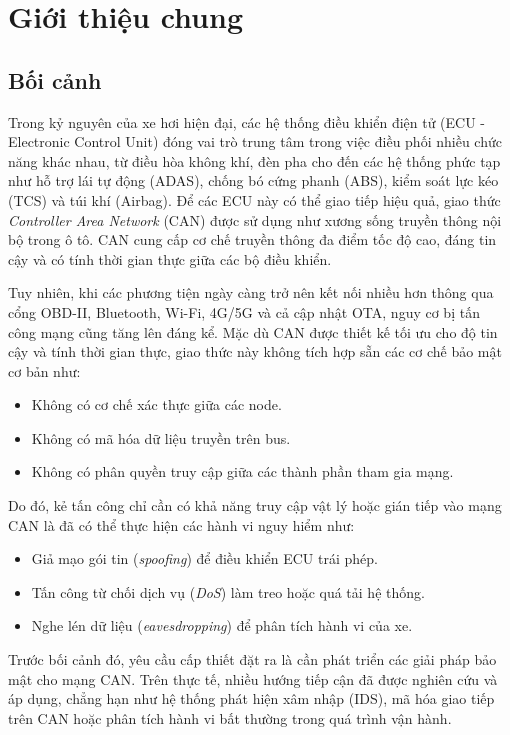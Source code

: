 \chapter{Giới thiệu chung}

\section{Bối cảnh}
Trong kỷ nguyên của xe hơi hiện đại, các hệ thống điều khiển điện tử (ECU - Electronic Control Unit) đóng vai trò trung tâm trong việc điều phối nhiều chức năng khác nhau, từ điều hòa không khí, đèn pha cho đến các hệ thống phức tạp như hỗ trợ lái tự động (ADAS), chống bó cứng phanh (ABS), kiểm soát lực kéo (TCS) và túi khí (Airbag). Để các ECU này có thể giao tiếp hiệu quả, giao thức \textit{Controller Area Network} (CAN) được sử dụng như xương sống truyền thông nội bộ trong ô tô. CAN cung cấp cơ chế truyền thông đa điểm tốc độ cao, đáng tin cậy và có tính thời gian thực giữa các bộ điều khiển.

Tuy nhiên, khi các phương tiện ngày càng trở nên kết nối nhiều hơn thông qua cổng OBD-II, Bluetooth, Wi-Fi, 4G/5G và cả cập nhật OTA, nguy cơ bị tấn công mạng cũng tăng lên đáng kể. Mặc dù CAN được thiết kế tối ưu cho độ tin cậy và tính thời gian thực, giao thức này không tích hợp sẵn các cơ chế bảo mật cơ bản như:

\begin{itemize}[leftmargin=*]
    \item Không có cơ chế xác thực giữa các node.
    \item Không có mã hóa dữ liệu truyền trên bus.
    \item Không có phân quyền truy cập giữa các thành phần tham gia mạng.
\end{itemize}

Do đó, kẻ tấn công chỉ cần có khả năng truy cập vật lý hoặc gián tiếp vào mạng CAN là đã có thể thực hiện các hành vi nguy hiểm như:

\begin{itemize}[leftmargin=*]
    \item Giả mạo gói tin (\textit{spoofing}) để điều khiển ECU trái phép.
    \item Tấn công từ chối dịch vụ (\textit{DoS}) làm treo hoặc quá tải hệ thống.
    \item Nghe lén dữ liệu (\textit{eavesdropping}) để phân tích hành vi của xe.
\end{itemize}

Trước bối cảnh đó, yêu cầu cấp thiết đặt ra là cần phát triển các giải pháp bảo mật cho mạng CAN. Trên thực tế, nhiều hướng tiếp cận đã được nghiên cứu và áp dụng, chẳng hạn như hệ thống phát hiện xâm nhập (IDS), mã hóa giao tiếp trên CAN hoặc phân tích hành vi bất thường trong quá trình vận hành.

